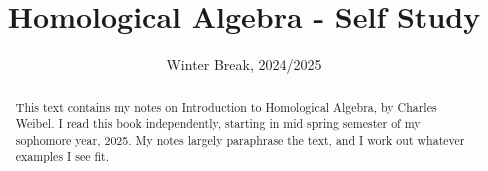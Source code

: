 \documentclass[11pt, letterpaper]{report}
\title{Homological Algebra - Self Study}
\date{Winter Break, 2024/2025}
\begin{document}
\maketitle
\begin{abstract}
	This text contains my notes on Introduction to Homological Algebra, by Charles Weibel. I read this book independently, starting in mid spring semester of my sophomore year, 2025. My notes largely paraphrase the text, and I work out whatever examples I see fit.
\end{abstract}
\tableofcontents
\end{document}
